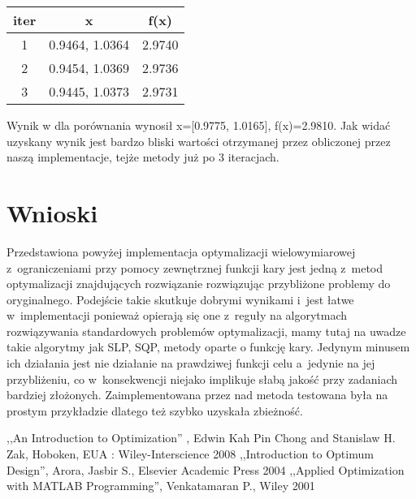 \documentclass{classrep}
\begin{document}
\begin{center}
\begin{tabular}{|c|c|c|}
\hline 
iter & x & f(x)\\
\hline
1 & 0.9464, 1.0364 & 2.9740\\ 
\hline 
2 &  0.9454, 1.0369 & 2.9736\\ 
\hline 
3 & 0.9445, 1.0373 & 2.9731\\ 
\hline 
\end{tabular} 
\end{center}


Wynik w \cite{2} dla porównania wynosił x=[0.9775, 1.0165], f(x)=2.9810.
Jak widać uzyskany wynik jest bardzo bliski wartości otrzymanej przez obliczonej przez naszą implementacje, tejże metody już po 3 iteracjach.

\section{Wnioski}
Przedstawiona powyżej implementacja optymalizacji wielowymiarowej z~ograniczeniami przy pomocy zewnętrznej funkcji kary jest jedną z~metod optymalizacji znajdujących rozwiązanie rozwiązując przybliżone problemy do oryginalnego. Podejście takie skutkuje dobrymi wynikami i~jest łatwe w~implementacji ponieważ opierają się one z~reguły na algorytmach rozwiązywania standardowych problemów optymalizacji, mamy tutaj na uwadze takie algorytmy jak SLP, SQP, metody oparte o funkcję kary. Jedynym minusem ich działania jest nie działanie na prawdziwej funkcji celu a~jedynie na jej przybliżeniu, co w~konsekwencji niejako implikuje słabą jakość przy zadaniach bardziej złożonych. Zaimplementowana przez nad metoda testowana była na prostym przykładzie dlatego też szybko uzyskała zbieżność.

\begin{thebibliography}{9}
 ,,An Introduction to Optimization'' , Edwin Kah Pin Chong and Stanislaw H. Zak, Hoboken, EUA : Wiley-Interscience 2008
 ,,Introduction to Optimum Design'', Arora, Jasbir S., Elsevier Academic Press 2004
 ,,Applied Optimization with MATLAB Programming'', Venkatamaran P., Wiley 2001
\end{thebibliography}
\end{document}
